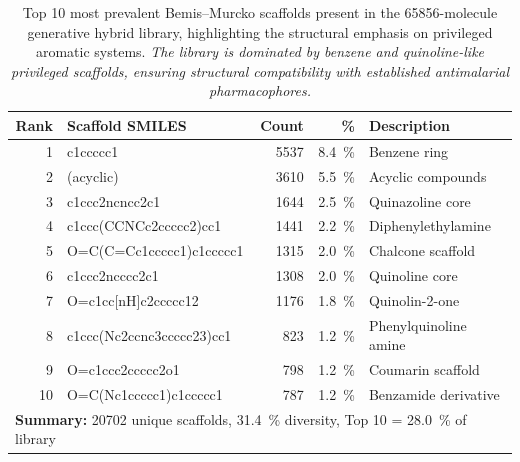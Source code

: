 \documentclass[journal=jcisd8,manuscript=suppinfo]{achemso}
\begin{document}
\begin{table}[htbp]
\centering
\caption{Top \num{10} most prevalent Bemis--Murcko scaffolds present in the \num{65856}-molecule generative hybrid library, highlighting the structural emphasis on privileged aromatic systems. \textit{The library is dominated by benzene and quinoline-like privileged scaffolds, ensuring structural compatibility with established antimalarial pharmacophores.}}
\label{tab:scaffolds}
\begin{tabular}{@{}r l r r l@{}}
\toprule
\textbf{Rank} & \textbf{Scaffold SMILES} & \textbf{Count} & \textbf{\unit{\percent}} & \textbf{Description} \\
\midrule
\num{1} & c1ccccc1 & \num{5537} & \qty{8.4}{\percent} & Benzene ring \\
\num{2} & (acyclic) & \num{3610} & \qty{5.5}{\percent} & Acyclic compounds \\
\num{3} & c1ccc2ncncc2c1 & \num{1644} & \qty{2.5}{\percent} & Quinazoline core \\
\num{4} & c1ccc(CCNCc2ccccc2)cc1 & \num{1441} & \qty{2.2}{\percent} & Diphenylethylamine \\
\num{5} & O=C(C=Cc1ccccc1)c1ccccc1 & \num{1315} & \qty{2.0}{\percent} & Chalcone scaffold \\
\num{6} & c1ccc2ncccc2c1 & \num{1308} & \qty{2.0}{\percent} & Quinoline core \\
\num{7} & O=c1cc[nH]c2ccccc12 & \num{1176} & \qty{1.8}{\percent} & Quinolin-2-one \\
\num{8} & c1ccc(Nc2ccnc3ccccc23)cc1 & \num{823} & \qty{1.2}{\percent} & Phenylquinoline amine \\
\num{9} & O=c1ccc2ccccc2o1 & \num{798} & \qty{1.2}{\percent} & Coumarin scaffold \\
\num{10} & O=C(Nc1ccccc1)c1ccccc1 & \num{787} & \qty{1.2}{\percent} & Benzamide derivative \\
\midrule
\multicolumn{5}{l}{\textbf{Summary:} \num{20702} unique scaffolds, \qty{31.4}{\percent} diversity, Top \num{10} = \qty{28.0}{\percent} of library} \\
\bottomrule
\end{tabular}
\end{table}
\end{document}
